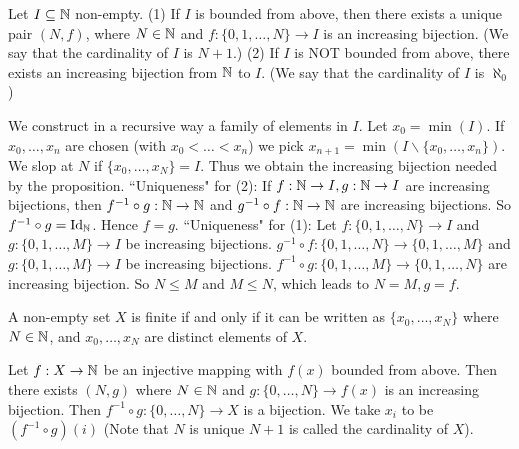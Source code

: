 \begin{propositionenv}
    Let $I\subseteq \mathbb{N}$ non-empty.
    \newline
    (1) If $I$ is bounded from above,  then there exists a unique pair $(N, f)$,  where $N\in \mathbb{N}$ and $f:\{0, 1, \dots, N\}\rightarrow I$ is an increasing bijection. (We say that the cardinality of $I$ is $N+1$.)
    \newline
    (2) If $I$ is NOT bounded from above,  there exists an increasing bijection from $\mathbb{N}$ to $I$. (We say that the cardinality of $I$ is $\aleph_0$) 
\end{propositionenv}
\begin{proofenv}
    \quad
    \newline
    We construct in a recursive way a family of elements in $I$. Let $x_0=\min(I)$. If $x_0, \dots , x_n$ are chosen (with $x_0<\dots<x_n$) we pick $x_{n+1}=\min(I\backslash\{x_0, \dots, x_n\})$. We slop at $N$ if $\{x_0, \dots, x_N\}=I$. Thus we obtain the increasing bijection needed by the proposition.
    \newline
    ``Uniqueness" for (2): If $f:\mathbb{N}\rightarrow I, g:\mathbb{N}\rightarrow I$ are increasing bijections,  then $f^{-1}\circ g:\mathbb{N}\rightarrow\mathbb{N}$ and $g^{-1}\circ f:\mathbb{N}\rightarrow\mathbb{N}$ are increasing bijections. So $f^{-1}\circ g=\mathrm{Id}_{\mathbb{N}}$. Hence $f=g$.
    \newline
    ``Uniqueness" for (1): Let $f:\{0, 1, \dots, N\}\rightarrow I$ and $g:\{0, 1, \dots, M\}\rightarrow I$ be increasing bijections. $g^{-1}\circ f:\{0, 1, \dots, N\}\rightarrow \{0, 1, \dots,  M\}$ and $g:\{0, 1, \dots, M\}\rightarrow I$ be increasing bijections. $f^{-1}\circ g:\{0, 1, \dots, M\}\rightarrow \{0, 1, \dots,  N\}$ are increasing bijection. So $N\le M$ and $M\le N$,  which leads to $N=M, g=f$. 
\end{proofenv}
\begin{corollaryenv}
    A non-empty set $X$ is finite if and only if it can be written as $\{x_0, \dots, x_N\}$ where $N\in \mathbb{N}$,  and $x_0, \dots, x_N$ are distinct elements of $X$.
\end{corollaryenv}
\begin{proofenv}
    Let $f:X\rightarrow \mathbb{N}$ be an injective mapping with $f(x)$ bounded from above. Then there exists $(N, g)$ where $N\in \mathbb{N}$ and $g:\{0, \dots , N\}\rightarrow f(x)$ is an increasing bijection. Then $f^{-1}\circ g:\{0, \dots, N\}\rightarrow X$ is a bijection. We take $x_i$ to be $(f^{-1}\circ g)(i)$ (Note that $N$ is unique $N+1$ is called the cardinality of $X$).
\end{proofenv}
